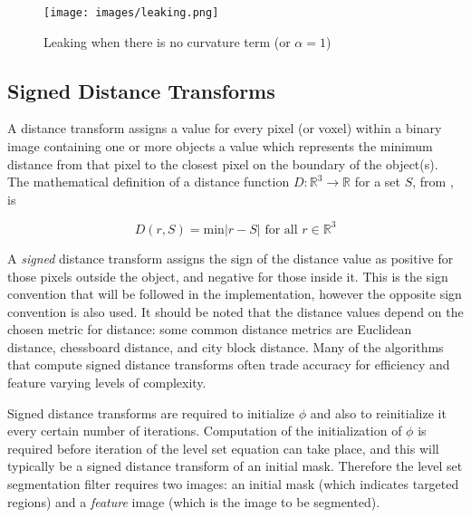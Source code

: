 \begin{figure}[h]
	\centering
		\texttt{[image: images/leaking.png]}
	\caption{Leaking when there is no curvature term (or $\alpha = 1$)}
	\label{leaking}
\end{figure}


	\subsection{Signed Distance Transforms}
A distance transform assigns a value for every pixel (or voxel) within a binary image containing one or more objects a value which represents the minimum distance from that pixel to the closest pixel on the boundary of the object(s). The mathematical definition of a distance function $D:\mathbb{R}^3 \rightarrow \mathbb{R}$ for a set $S$, from \cite{oshersethian}, is
	
	\begin{equation}
	D(r,S) = \textrm{min}{|r-S|} \textrm{ for all } r \in \mathbb{R}^3
	\label{eq:distancetransform}
	\end{equation}

A \textit{signed} distance transform assigns the sign of the distance value as positive for those pixels outside the object, and negative for those inside it. This is the sign convention that will be followed in the implementation, however the opposite sign convention is also used. It should be noted that the distance values depend on the chosen metric for distance: some common distance metrics are Euclidean distance, chessboard distance, and city block distance. Many of the algorithms that compute signed distance transforms often trade accuracy for efficiency and feature varying levels of complexity.

Signed distance transforms are required to initialize $\phi$ and also to reinitialize it every certain number of iterations. Computation of the initialization of $\phi$ is required before iteration of the level set equation can take place, and this will typically be a signed distance transform of an initial mask. Therefore the level set segmentation filter requires two images: an initial mask (which indicates targeted regions) and a \textit{feature} image (which is the image to be segmented). 
	
